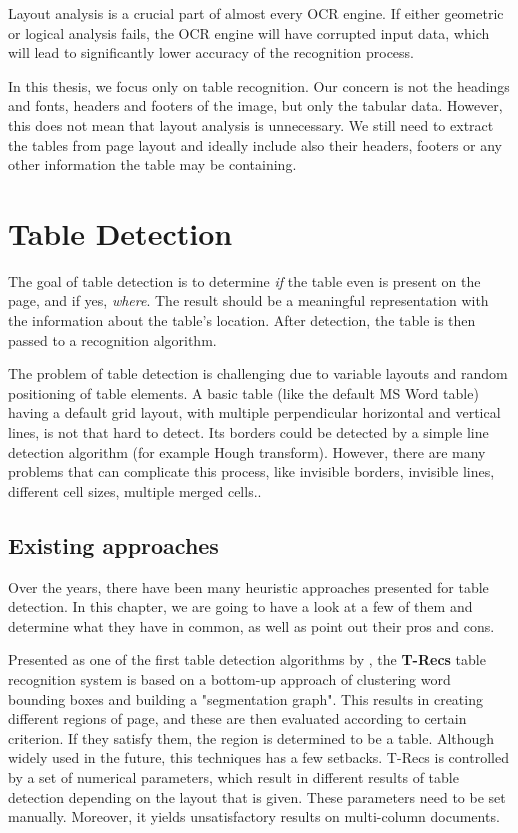 Layout analysis is a crucial part of almost every OCR engine. If either geometric or logical analysis fails, the OCR engine will have corrupted input data, which will lead to significantly lower accuracy of the recognition process. 

In this thesis, we focus only on table recognition. Our concern is not the headings and fonts, headers and footers of the image, but only the tabular data. However, this does not mean that layout analysis is unnecessary. We still need to extract the tables from page layout and ideally include also their headers, footers or any other information the table may be containing.

\section{Table Detection}

The goal of table detection is to determine \emph{if} the table even is present on the page, and if yes, \emph{where}. The result should be a meaningful representation with the information about the table's location. After detection, the table is then passed to a recognition algorithm.

The problem of table detection is challenging due to variable layouts and random positioning of table elements. A basic table (like the default MS Word table) having a default grid layout, with multiple perpendicular horizontal and vertical lines, is not that hard to detect. Its borders could be detected by a simple line detection algorithm (for example Hough transform). However, there are many problems that can complicate this process, like invisible borders, invisible lines, different cell sizes, multiple merged cells..

\subsection{Existing approaches}

Over the years, there have been many heuristic approaches presented for table detection. In this chapter, we are going to have a look at a few of them and determine what they have in common, as well as point out their pros and cons.

Presented as one of the first table detection algorithms by \citet{TRecs}, the \textbf{T-Recs} table recognition system is based on a bottom-up approach of clustering word bounding boxes and building a "segmentation graph". This results in creating different regions of page, and these are then evaluated according to certain criterion. If they satisfy them, the region is determined to be a table. Although widely used in the future, this techniques has a few setbacks. T-Recs is controlled by a set of numerical parameters, which result in different results of table detection depending on the layout that is given. These parameters need to be set manually. Moreover, it yields unsatisfactory results on multi-column documents.

